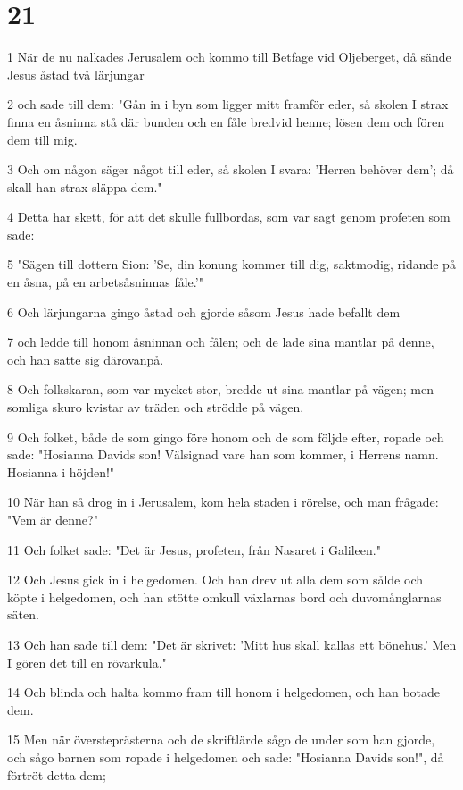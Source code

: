 \chapter{21}

\par 1 När de nu nalkades Jerusalem och kommo till Betfage vid Oljeberget, då sände Jesus åstad två lärjungar
\par 2 och sade till dem: "Gån in i byn som ligger mitt framför eder, så skolen I strax finna en åsninna stå där bunden och en fåle bredvid henne; lösen dem och fören dem till mig.
\par 3 Och om någon säger något till eder, så skolen I svara: 'Herren behöver dem'; då skall han strax släppa dem."
\par 4 Detta har skett, för att det skulle fullbordas, som var sagt genom profeten som sade:
\par 5 "Sägen till dottern Sion: 'Se, din konung kommer till dig, saktmodig, ridande på en åsna, på en arbetsåsninnas fåle.'"
\par 6 Och lärjungarna gingo åstad och gjorde såsom Jesus hade befallt dem
\par 7 och ledde till honom åsninnan och fålen; och de lade sina mantlar på denne, och han satte sig därovanpå.
\par 8 Och folkskaran, som var mycket stor, bredde ut sina mantlar på vägen; men somliga skuro kvistar av träden och strödde på vägen.
\par 9 Och folket, både de som gingo före honom och de som följde efter, ropade och sade: "Hosianna Davids son! Välsignad vare han som kommer, i Herrens namn. Hosianna i höjden!"
\par 10 När han så drog in i Jerusalem, kom hela staden i rörelse, och man frågade: "Vem är denne?"
\par 11 Och folket sade: "Det är Jesus, profeten, från Nasaret i Galileen."
\par 12 Och Jesus gick in i helgedomen. Och han drev ut alla dem som sålde och köpte i helgedomen, och han stötte omkull växlarnas bord och duvomånglarnas säten.
\par 13 Och han sade till dem: "Det är skrivet: 'Mitt hus skall kallas ett bönehus.' Men I gören det till en rövarkula."
\par 14 Och blinda och halta kommo fram till honom i helgedomen, och han botade dem.
\par 15 Men när översteprästerna och de skriftlärde sågo de under som han gjorde, och sågo barnen som ropade i helgedomen och sade: "Hosianna Davids son!", då förtröt detta dem;
